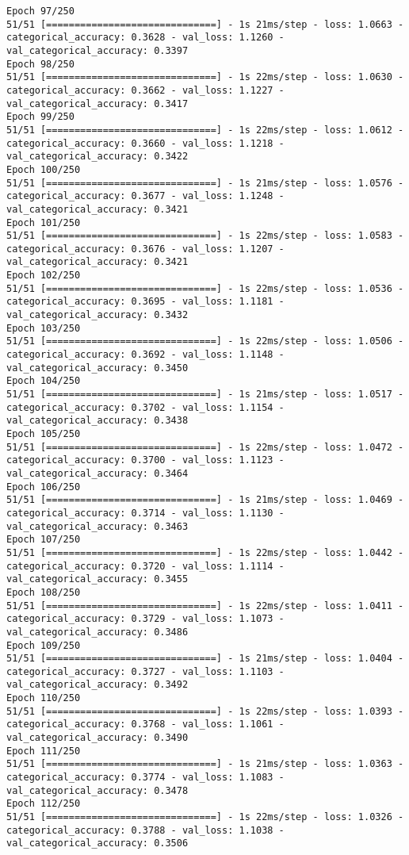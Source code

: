 \begin{lstlisting}
Epoch 97/250
51/51 [==============================] - 1s 21ms/step - loss: 1.0663 - categorical_accuracy: 0.3628 - val_loss: 1.1260 - val_categorical_accuracy: 0.3397
Epoch 98/250
51/51 [==============================] - 1s 22ms/step - loss: 1.0630 - categorical_accuracy: 0.3662 - val_loss: 1.1227 - val_categorical_accuracy: 0.3417
Epoch 99/250
51/51 [==============================] - 1s 22ms/step - loss: 1.0612 - categorical_accuracy: 0.3660 - val_loss: 1.1218 - val_categorical_accuracy: 0.3422
Epoch 100/250
51/51 [==============================] - 1s 21ms/step - loss: 1.0576 - categorical_accuracy: 0.3677 - val_loss: 1.1248 - val_categorical_accuracy: 0.3421
Epoch 101/250
51/51 [==============================] - 1s 22ms/step - loss: 1.0583 - categorical_accuracy: 0.3676 - val_loss: 1.1207 - val_categorical_accuracy: 0.3421
Epoch 102/250
51/51 [==============================] - 1s 22ms/step - loss: 1.0536 - categorical_accuracy: 0.3695 - val_loss: 1.1181 - val_categorical_accuracy: 0.3432
Epoch 103/250
51/51 [==============================] - 1s 22ms/step - loss: 1.0506 - categorical_accuracy: 0.3692 - val_loss: 1.1148 - val_categorical_accuracy: 0.3450
Epoch 104/250
51/51 [==============================] - 1s 21ms/step - loss: 1.0517 - categorical_accuracy: 0.3702 - val_loss: 1.1154 - val_categorical_accuracy: 0.3438
Epoch 105/250
51/51 [==============================] - 1s 22ms/step - loss: 1.0472 - categorical_accuracy: 0.3700 - val_loss: 1.1123 - val_categorical_accuracy: 0.3464
Epoch 106/250
51/51 [==============================] - 1s 21ms/step - loss: 1.0469 - categorical_accuracy: 0.3714 - val_loss: 1.1130 - val_categorical_accuracy: 0.3463
Epoch 107/250
51/51 [==============================] - 1s 22ms/step - loss: 1.0442 - categorical_accuracy: 0.3720 - val_loss: 1.1114 - val_categorical_accuracy: 0.3455
Epoch 108/250
51/51 [==============================] - 1s 22ms/step - loss: 1.0411 - categorical_accuracy: 0.3729 - val_loss: 1.1073 - val_categorical_accuracy: 0.3486
Epoch 109/250
51/51 [==============================] - 1s 21ms/step - loss: 1.0404 - categorical_accuracy: 0.3727 - val_loss: 1.1103 - val_categorical_accuracy: 0.3492
Epoch 110/250
51/51 [==============================] - 1s 22ms/step - loss: 1.0393 - categorical_accuracy: 0.3768 - val_loss: 1.1061 - val_categorical_accuracy: 0.3490
Epoch 111/250
51/51 [==============================] - 1s 21ms/step - loss: 1.0363 - categorical_accuracy: 0.3774 - val_loss: 1.1083 - val_categorical_accuracy: 0.3478
Epoch 112/250
51/51 [==============================] - 1s 22ms/step - loss: 1.0326 - categorical_accuracy: 0.3788 - val_loss: 1.1038 - val_categorical_accuracy: 0.3506

\end{lstlisting}
